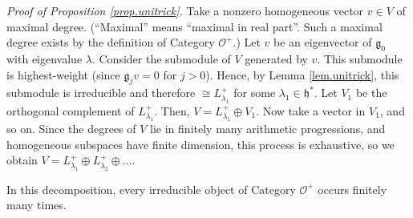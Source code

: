 \documentclass[etingof-lie.tex]{subfiles}
\begin{document}
\textit{Proof of Proposition \ref{prop.unitrick}.} Take a nonzero homogeneous
vector $v\in V$ of maximal degree. (``Maximal'' means ``maximal in real
part''. Such a maximal degree exists by the definition of Category
$\mathcal{O}^{+}$.) Let $v$ be an eigenvector of $\mathfrak{g}_{0}$ with
eigenvalue $\lambda$. Consider the submodule of $V$ generated by $v$. This
submodule is highest-weight (since $\mathfrak{g}_{j}v=0$ for $j>0$). Hence, by
Lemma \ref{lem.unitrick}, this submodule is irreducible and therefore $\cong
L_{\lambda_{1}}^{+}$ for some $\lambda_{1}\in\mathfrak{h}^{\ast}$. Let $V_{1}$
be the orthogonal complement of $L_{\lambda_{1}}^{+}$. Then, $V=L_{\lambda
_{1}}^{+}\oplus V_{1}$. Now take a vector in $V_{1}$, and so on. Since the
degrees of $V$ lie in finitely many arithmetic progressions, and homogeneous
subspaces have finite dimension, this process is exhaustive, so we obtain
$V=L_{\lambda_{1}}^{+}\oplus L_{\lambda_{2}}^{+}\oplus...$.

\begin{remark}
In this decomposition, every irreducible object of Category $\mathcal{O}^{+}$
occurs finitely many times.
\end{remark}
\end{document}
